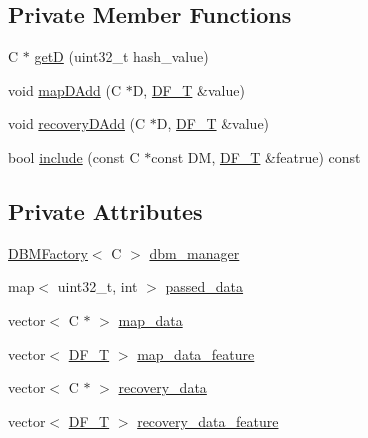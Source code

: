 \subsection*{Private Member Functions}
\begin{DoxyCompactItemize}
\item 
C $\ast$ \mbox{\hyperlink{classgraphsat_1_1_d_b_mset_ae552a8fb83cb9a08013367be5134aa1d}{getD}} (uint32\+\_\+t hash\+\_\+value)
\item 
void \mbox{\hyperlink{classgraphsat_1_1_d_b_mset_aa4027065a59bc886739ceb3b5b0ebcbf}{map\+D\+Add}} (C $\ast$D, \mbox{\hyperlink{namespacegraphsat_a9d75165dd4e82d2e03ffd07fe27533d0}{D\+F\+\_\+T}} \&value)
\item 
void \mbox{\hyperlink{classgraphsat_1_1_d_b_mset_a455f7d48ef36013cf3c8df2ea07e95d8}{recovery\+D\+Add}} (C $\ast$D, \mbox{\hyperlink{namespacegraphsat_a9d75165dd4e82d2e03ffd07fe27533d0}{D\+F\+\_\+T}} \&value)
\item 
bool \mbox{\hyperlink{classgraphsat_1_1_d_b_mset_a2b49bd304c445eb02b1a544900765d70}{include}} (const C $\ast$const DM, \mbox{\hyperlink{namespacegraphsat_a9d75165dd4e82d2e03ffd07fe27533d0}{D\+F\+\_\+T}} \&featrue) const
\end{DoxyCompactItemize}
\subsection*{Private Attributes}
\begin{DoxyCompactItemize}
\item 
\mbox{\hyperlink{classgraphsat_1_1_d_b_m_factory}{D\+B\+M\+Factory}}$<$ C $>$ \mbox{\hyperlink{classgraphsat_1_1_d_b_mset_aa24554b9389c7743a5aad5c3c75ceb44}{dbm\+\_\+manager}}
\item 
map$<$ uint32\+\_\+t, int $>$ \mbox{\hyperlink{classgraphsat_1_1_d_b_mset_a7e9f628890e7beebbcbb5b8922b96d4c}{passed\+\_\+data}}
\item 
vector$<$ C $\ast$ $>$ \mbox{\hyperlink{classgraphsat_1_1_d_b_mset_a0c24329d7fb3b51735ed8747b9224540}{map\+\_\+data}}
\item 
vector$<$ \mbox{\hyperlink{namespacegraphsat_a9d75165dd4e82d2e03ffd07fe27533d0}{D\+F\+\_\+T}} $>$ \mbox{\hyperlink{classgraphsat_1_1_d_b_mset_ae3139d7e806f976f733eeac33b0b5b30}{map\+\_\+data\+\_\+feature}}
\item 
vector$<$ C $\ast$ $>$ \mbox{\hyperlink{classgraphsat_1_1_d_b_mset_adfd9208fe16d211f33977c3d83d17342}{recovery\+\_\+data}}
\item 
vector$<$ \mbox{\hyperlink{namespacegraphsat_a9d75165dd4e82d2e03ffd07fe27533d0}{D\+F\+\_\+T}} $>$ \mbox{\hyperlink{classgraphsat_1_1_d_b_mset_a005bc0a422afaa2e6b742264345f1972}{recovery\+\_\+data\+\_\+feature}}
\end{DoxyCompactItemize}


